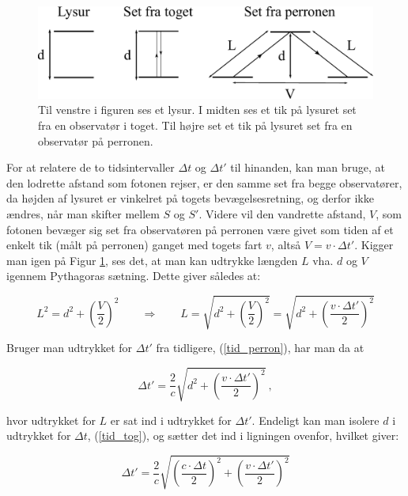 \begin{figure}[h!]
	\centering
	\includegraphics[scale=0.90]{Relativitetsteori/tidsforlang2.pdf}
	\caption{Til venstre i figuren ses et lysur. I midten ses et tik på lysuret set fra en observatør i toget. Til højre set et tik på lysuret set fra en observatør på perronen.}
	\label{tidfor}
\end{figure} 

For at relatere de to tidsintervaller $\Delta t$ og $\Delta t'$ til hinanden, kan man bruge, at den lodrette afstand som fotonen rejser, er den samme set fra begge observatører, da højden af lysuret er vinkelret på togets bevægelsesretning, og derfor ikke ændres, når man skifter mellem $S$ og $S'$. Videre vil den vandrette afstand, $V$, som fotonen bevæger sig set fra observatøren på perronen være givet som tiden af et enkelt tik (målt på perronen) ganget med togets fart $v$, altså $V = v \cdot \Delta t'$. Kigger man igen på Figur \ref{tidfor}, ses det, at man kan udtrykke længden $L$ vha. $d$ og $V$ igennem Pythagoras sætning. Dette giver således at:

$$L^2 = d^2 + \left( \frac{V}{2} \right)^2 \quad \quad \Rightarrow \quad \quad  L = \sqrt{d^2 + \left( \frac{V}{2} \right)^2} = \sqrt{d^2 + \left( \frac{v \cdot \Delta t'}{2} \right)^2}$$

\vspace{2mm}

Bruger man udtrykket for $\Delta t'$ fra tidligere, (\ref{tid_perron}), har man da at

$$\Delta t' = \frac{2}{c} \sqrt{d^2 + \left( \frac{v \cdot \Delta t'}{2} \right)^2} \ , $$ 

\vspace{2mm}

hvor udtrykket for $L$ er sat ind i udtrykket for $\Delta t'$. Endeligt kan man isolere $d$ i udtrykket for $\Delta t$, (\ref{tid_tog}), og sætter det ind i ligningen ovenfor, hvilket giver:

$$\Delta t' = \frac{2}{c} \sqrt{\left( \frac{c \cdot \Delta t}{2} \right)^2 + \left( \frac{v \cdot \Delta t'}{2} \right)^2}$$ 

\vspace{2mm}

